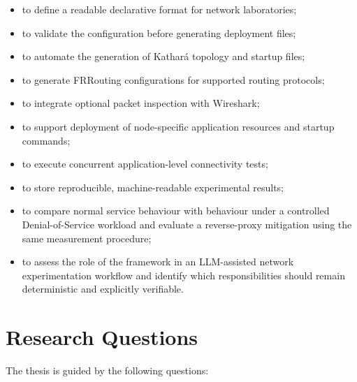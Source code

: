 \documentclass[a4paper,10pt,titlepage,twoside]{book}
\numberwithin{equation}{chapter}
\theoremstyle{plain}
\theoremstyle{definition}
\begin{document}
\begin{itemize}
    \item to define a readable declarative format for network laboratories;
    \item to validate the configuration before generating deployment files;
    \item to automate the generation of Kathar\'a topology and startup files;
    \item to generate FRRouting configurations for supported routing
    protocols;
    \item to integrate optional packet inspection with Wireshark;
    \item to support deployment of node-specific application resources and
    startup commands;
    \item to execute concurrent application-level connectivity tests;
    \item to store reproducible, machine-readable experimental results;
    \item to compare normal service behaviour with behaviour under a
    controlled Denial-of-Service workload and evaluate a reverse-proxy
    mitigation using the same measurement procedure;
    \item to assess the role of the framework in an LLM-assisted network
    experimentation workflow and identify which responsibilities should remain
    deterministic and explicitly verifiable.
\end{itemize}

\section*{Research Questions}
{}

The thesis is guided by the following questions:
\end{document}
